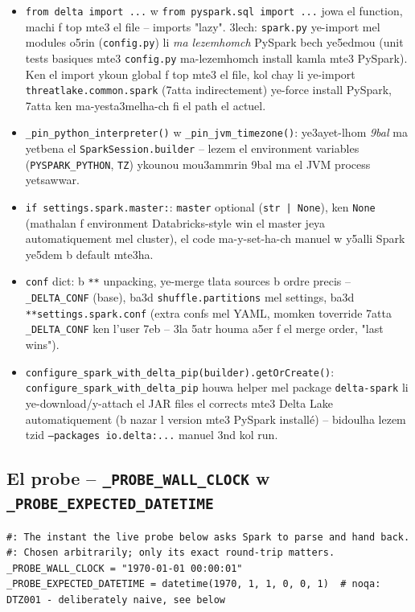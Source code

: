 \documentclass[11pt,a4paper]{report}
\DeclareRobustCommand{\code}[1]{\texttt{#1}}
\begin{document}
\begin{itemize}
  \item \code{from delta import ...} w \code{from pyspark.sql import ...}
        jowa el function, machi f top mte3 el file -- imports "lazy". 3lech:
        \code{spark.py} ye-import mel modules o5rin (\code{config.py}) li
        \emph{ma lezemhomch} PySpark bech ye5edmou (unit tests basiques
        mte3 \code{config.py} ma-lezemhomch install kamla mte3 PySpark).
        Ken el import ykoun global f top mte3 el file, kol chay li
        ye-import \code{threatlake.common.spark} (7atta indirectement)
        ye-force install PySpark, 7atta ken ma-yesta3melha-ch fi el path
        el actuel.
  \item \code{\_pin\_python\_interpreter()} w \code{\_pin\_jvm\_timezone()}:
        ye3ayet-lhom \emph{9bal} ma yetbena el \code{SparkSession.builder}
        -- lezem el environment variables (\code{PYSPARK\_PYTHON},
        \code{TZ}) ykounou mou3ammrin 9bal ma el JVM process yetsawwar.
  \item \code{if settings.spark.master:}: \code{master} optional (\code{str
        | None}), ken \code{None} (mathalan f environment Databricks-style
        win el master jeya automatiquement mel cluster), el code ma-y-set-ha-ch
        manuel w y5alli Spark ye5dem b default mte3ha.
  \item \code{conf} dict: b \code{**} unpacking, ye-merge tlata sources
        b ordre precis -- \code{\_DELTA\_CONF} (base), ba3d
        \code{shuffle.partitions} mel settings, ba3d \code{**settings.spark.conf}
        (extra confs mel YAML, momken toverride 7atta \code{\_DELTA\_CONF}
        ken l'user 7eb -- 3la 5atr houma a5er f el merge order, "last wins").
  \item \code{configure\_spark\_with\_delta\_pip(builder).getOrCreate()}:
        \code{configure\_spark\_with\_delta\_pip} houwa helper mel package
        \code{delta-spark} li ye-download/y-attach el JAR files el corrects
        mte3 Delta Lake automatiquement (b nazar l version mte3 PySpark
        installé) -- bidoulha lezem tzid \code{--packages io.delta:...}
        manuel 3nd kol run.
\end{itemize}

\subsection{El probe -- \code{\_PROBE\_WALL\_CLOCK} w \code{\_PROBE\_EXPECTED\_DATETIME}}

\begin{lstlisting}[style=pystyle]
#: The instant the live probe below asks Spark to parse and hand back.
#: Chosen arbitrarily; only its exact round-trip matters.
_PROBE_WALL_CLOCK = "1970-01-01 00:00:01"
_PROBE_EXPECTED_DATETIME = datetime(1970, 1, 1, 0, 0, 1)  # noqa: DTZ001 - deliberately naive, see below
\end{lstlisting}
\end{document}
